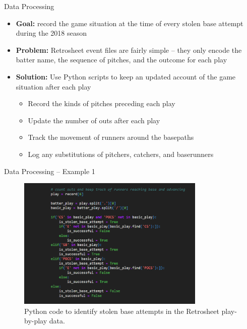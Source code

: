 \documentclass[10pt]{beamer}
\begin{document}
\begin{frame}{Data Processing}
\begin{itemize}
    \item \textbf{Goal:} record the game situation at the time of every stolen base attempt during the 2018 season
    \vspace{3mm}
    \item \textbf{Problem:} Retrosheet event files are fairly simple -- they only encode the batter name, the sequence of pitches, and the outcome for each play
    \vspace{3mm}
    \item \textbf{Solution:} Use Python scripts to keep an updated account of the game situation after each play
    \begin{itemize}
        \item Record the kinds of pitches preceding each play

        \item Update the number of outs after each play
        
        \item Track the movement of runners around the basepaths

        \item Log any substitutions of pitchers, catchers, and baserunners
    \end{itemize}
\end{itemize}
\end{frame}

\begin{frame}{Data Processing -- Example 1}
\begin{figure}
    \includegraphics[height=2.5in]{images/code_example_1.png}
    \caption{Python code to identify stolen base attempts in the Retrosheet play-by-play data.}
    \label{code_example_1}
\end{figure}
\end{frame}
\end{document}
